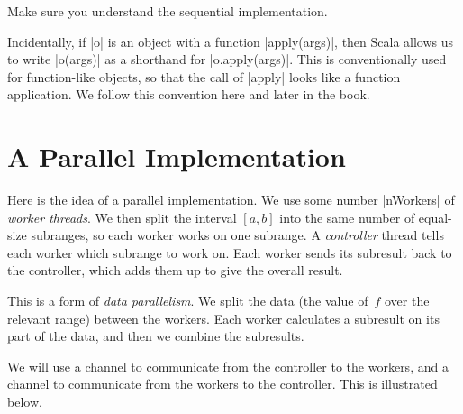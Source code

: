 \begin{instruction}
Make sure you understand the sequential implementation.
\end{instruction}

Incidentally, if |o| is an object with a function |apply(args)|, then Scala
allows us to write |o(args)| as a shorthand for |o.apply(args)|.  This is
conventionally used for function-like objects, so that the call of |apply|
looks like a function application.  We follow this convention here and later
in the book.


\section{A Parallel Implementation}

Here is the idea of a parallel implementation.  We use some number |nWorkers|
of \emph{worker threads}.  We then split the interval $[a,b]$ into the same
number of equal-size subranges, so each worker works on one subrange.  A
\emph{controller} thread tells each worker which subrange to work on.  Each
worker sends its subresult back to the controller, which adds them up to give
the overall result.

This is a form of \emph{data parallelism}.  We split the data (the value
of~$f$ over the relevant range) between the workers.  Each worker calculates a
subresult on its part of the data, and then we combine the subresults. 


We will use a channel  to communicate from the
controller to the workers, and a channel 
to communicate from the workers to the controller.  This is illustrated below.
%
\begin{center}
\end{center}

